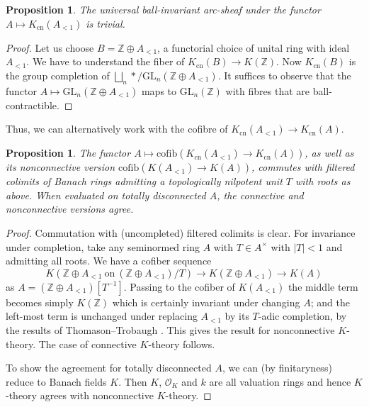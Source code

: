\documentclass[11pt]{amsart}
\numberwithin{equation}{section}
\numberwithin{theorem}{section}
\newtheorem{proposition}[theorem]{Proposition}
\theoremstyle{definition}
\begin{document}
\begin{proposition} The universal ball-invariant arc-sheaf under the functor $A\mapsto K_{\mathrm{cn}}(A_{<1})$ is trivial.
\end{proposition}

\begin{proof} Let us choose $B=\mathbb Z\oplus A_{<1}$, a functorial choice of unital ring with ideal $A_{<1}$. We have to understand the fiber of $K_{\mathrm{cn}}(B)\to K(\mathbb Z)$. Now $K_{\mathrm{cn}}(B)$ is the group completion of $\bigsqcup_n \ast/\mathrm{GL}_n(\mathbb Z\oplus A_{<1})$. It suffices to observe that the functor $A\mapsto \mathrm{GL}_n(\mathbb Z\oplus A_{<1})$ maps to $\mathrm{GL}_n(\mathbb Z)$ with fibres that are ball-contractible.
\end{proof}

Thus, we can alternatively work with the cofibre of $K_{\mathrm{cn}}(A_{<1})\to K_{\mathrm{cn}}(A)$.

\begin{proposition}\label{prop:Ktheoryfinitary} The functor $A\mapsto \mathrm{cofib}(K_{\mathrm{cn}}(A_{<1})\to K_{\mathrm{cn}}(A))$, as well as its nonconnective version $\mathrm{cofib}(K(A_{<1})\to K(A))$, commutes with filtered colimits of Banach rings admitting a topologically nilpotent unit $T$ with roots as above. When evaluated on totally disconnected $A$, the connective and nonconnective versions agree.
\end{proposition}

\begin{proof} Commutation with (uncompleted) filtered colimits is clear. For invariance under completion, take any seminormed ring $A$ with $T\in A^\times$ with $|T|<1$ and admitting all roots. We have a cofiber sequence
\[
K(\mathbb Z\oplus A_{<1}\ \mathrm{on}\ (\mathbb Z\oplus A_{<1})/T)\to K(\mathbb Z\oplus A_{<1})\to K(A)
\]
as $A=(\mathbb Z\oplus A_{<1})[T^{-1}]$. Passing to the cofiber of $K(A_{<1})$ the middle term becomes simply $K(\mathbb Z)$ which is certainly invariant under changing $A$; and the left-most term is unchanged under replacing $A_{<1}$ by its $T$-adic completion, by the results of Thomason--Trobaugh \cite[Proposition 3.19]{ThomasonTrobaugh}. This gives the result for nonconnective $K$-theory. The case of connective $K$-theory follows.

To show the agreement for totally disconnected $A$, we can (by finitaryness) reduce to Banach fields $K$. Then $K$, $\mathcal O_K$ and $k$ are all valuation rings and hence $K$-theory agrees with nonconnective $K$-theory.
\end{proof}
\end{document}

